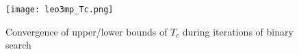 \begin{figure}
    \centering
    \texttt{[image: leo3mp\_Tc.png]} %
    \caption{Convergence of upper/lower bounds of $T_{c}$ during iterations of binary search}
    \label{fig:Tc}
\end{figure}